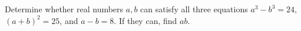 Determine whether real numbers $a,b$ can satisfy all three equations $a^3-b^3=24$, $(a+b)^2=25$, and $a-b=8$. If they can, find $ab$.
